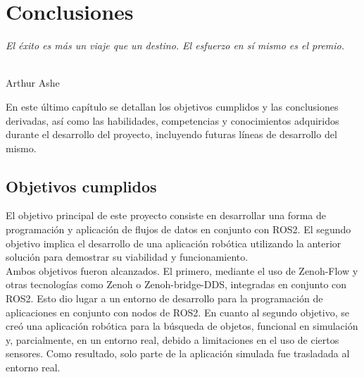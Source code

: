 \chapter{Conclusiones}
\label{cap:capitulo6}

\begin{flushright}
\begin{minipage}[]{10cm}
\emph{El éxito es más un viaje que un destino. El esfuerzo en sí mismo es el premio.}\\
\end{minipage}\\

Arthur Ashe\\
\end{flushright}

\vspace{1cm}


En este último capítulo se detallan los objetivos cumplidos y las conclusiones
derivadas, así como las habilidades, competencias y conocimientos adquiridos
durante el desarrollo del proyecto, incluyendo futuras líneas de desarrollo del
mismo.

\section{Objetivos cumplidos}
\label{sec:objetivos_cumplidos}

El objetivo principal de este proyecto consiste en desarrollar una forma de
programación y aplicación de flujos de datos en conjunto con ROS2.
El segundo objetivo implica el desarrollo de una aplicación robótica utilizando
la anterior solución para demostrar su viabilidad y funcionamiento.
\\

Ambos objetivos fueron alcanzados.
El primero, mediante el uso de Zenoh-Flow y otras tecnologías como Zenoh o
Zenoh-bridge-DDS, integradas en conjunto con ROS2.
Esto dio lugar a un entorno de desarrollo para la programación de aplicaciones en
conjunto con nodos de ROS2.
En cuanto al segundo objetivo, se creó una aplicación robótica para la búsqueda
de objetos, funcional en simulación y, parcialmente, en un entorno real, debido
a limitaciones en el uso de ciertos sensores.
Como resultado, solo parte de la aplicación simulada fue trasladada al entorno
real.
\\

